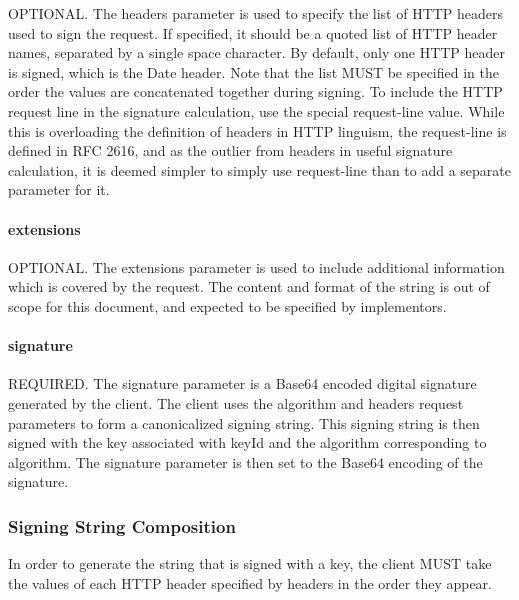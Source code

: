 O\+P\+T\+I\+O\+N\+A\+L. The {\ttfamily headers} parameter is used to specify the list of H\+T\+T\+P headers used to sign the request. If specified, it should be a quoted list of H\+T\+T\+P header names, separated by a single space character. By default, only one H\+T\+T\+P header is signed, which is the {\ttfamily Date} header. Note that the list M\+U\+S\+T be specified in the order the values are concatenated together during signing. To include the H\+T\+T\+P request line in the signature calculation, use the special {\ttfamily request-\/line} value. While this is overloading the definition of {\ttfamily headers} in H\+T\+T\+P linguism, the request-\/line is defined in R\+F\+C 2616, and as the outlier from headers in useful signature calculation, it is deemed simpler to simply use {\ttfamily request-\/line} than to add a separate parameter for it.

\paragraph*{extensions}

O\+P\+T\+I\+O\+N\+A\+L. The {\ttfamily extensions} parameter is used to include additional information which is covered by the request. The content and format of the string is out of scope for this document, and expected to be specified by implementors.

\paragraph*{signature}

R\+E\+Q\+U\+I\+R\+E\+D. The {\ttfamily signature} parameter is a {\ttfamily Base64} encoded digital signature generated by the client. The client uses the {\ttfamily algorithm} and {\ttfamily headers} request parameters to form a canonicalized {\ttfamily signing string}. This {\ttfamily signing string} is then signed with the key associated with {\ttfamily key\+Id} and the algorithm corresponding to {\ttfamily algorithm}. The {\ttfamily signature} parameter is then set to the {\ttfamily Base64} encoding of the signature.

\subsubsection*{Signing String Composition}

In order to generate the string that is signed with a key, the client M\+U\+S\+T take the values of each H\+T\+T\+P header specified by {\ttfamily headers} in the order they appear.


